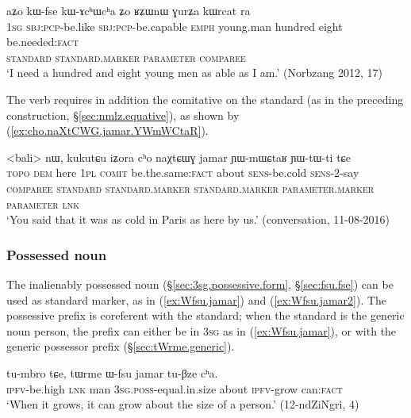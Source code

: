 \begin{exe}
\ex \label{ex:kWfse.kAchWcha}
\glll aʑo kɯ-fse kɯ-ɤcʰɯcʰa ʑo ʁʑɯnɯ ɣurʑa kɯrcat ra\\
\textsc{1sg} \textsc{sbj}:\textsc{pcp}-be.like \textsc{sbj}:\textsc{pcp}-be.capable \textsc{emph} young.man hundred eight be.needed:\textsc{fact} \\
\textsc{standard} \textsc{standard}.\textsc{marker} \textsc{parameter} { } \textsc{comparee} \\
\glt `I need a hundred and eight young men as able as I am.' (Norbzang 2012, 17)
\end{exe}

The verb  requires in addition the comitative  on the standard (as in the preceding construction, §\ref{sec:nmlz.equative}), as shown by (\ref{ex:cho.naXtCWG.jamar.YWmWCtaR}).

\begin{exe}
\ex \label{ex:cho.naXtCWG.jamar.YWmWCtaR}
\glll <bali> nɯ, kukutɕu iʑora cʰo naχtɕɯɣ jamar ɲɯ-mɯɕtaʁ ɲɯ-tɯ-ti tɕe \\
\textsc{topo} \textsc{dem} here \textsc{1pl} \textsc{comit} be.the.same:\textsc{fact} about \textsc{sens}-be.cold \textsc{sens}-2-say \\
\textsc{comparee} { }  \textsc{standard} \textsc{standard}.\textsc{marker} \textsc{standard}.\textsc{marker}  \textsc{parameter}.\textsc{marker} \textsc{parameter} \textsc{lnk} \\
\glt `You said that it was as cold in Paris as here by us.' (conversation, 11-08-2016)
\end{exe}




\subsubsection{Possessed noun} \label{sec:Wfsu.equative}
The inalienably possessed noun   (§\ref{sec:3sg.possessive.form}, §\ref{sec:fsu.fse}) can be used as standard marker, as in (\ref{ex:Wfsu.jamar}) and (\ref{ex:Wfsu.jamar2}). The possessive prefix is coreferent with the standard; when the standard is the generic noun  {person}, the prefix can either be in \textsc{3sg} as in (\ref{ex:Wfsu.jamar}), or with the generic possessor prefix (§\ref{sec:tWrme.generic}).

\begin{exe}
\ex \label{ex:Wfsu.jamar}
\gll tu-mbro tɕe, tɯrme ɯ-fsu jamar tu-βze cʰa. \\
\textsc{ipfv}-be.high \textsc{lnk}  man \textsc{3sg}.\textsc{poss}-equal.in.size about \textsc{ipfv}-grow can:\textsc{fact} \\
\glt `When it grows, it can grow about the size of a person.' (12-ndZiNgri, 4)
\end{exe}

